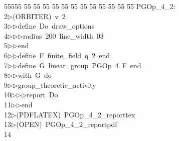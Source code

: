 %
%
\begin{tabbing}
55555 \= 55 \= 55 \= 55 \= 55 \= 55 \= 55 \= 55 \= 55 \= 55 \= 55 \= 55 \= 55 \= \>PGOp\_4\_2:\\[0pt]
2\>$\triangleright$\>(ORBITER)\ v\ 2\ \\[0pt]
3\>$\triangleright$\>$\triangleright$\>define\ Do\ draw\_options\ \\[0pt]
4\>$\triangleright$\>$\triangleright$\>$\triangleright$\>radius\ 200\ line\_width\ 03\ \\[0pt]
5\>$\triangleright$\>$\triangleright$\>end\ \\[0pt]
6\>$\triangleright$\>$\triangleright$\>define\ F\ finite\_field\ q\ 2\ end\ \\[0pt]
7\>$\triangleright$\>$\triangleright$\>define\ G\ linear\_group\ PGOp\ 4\ F\ end\ \\[0pt]
8\>$\triangleright$\>$\triangleright$\>with\ G\ do\ \\[0pt]
9\>$\triangleright$\>$\triangleright$\>group\_theoretic\_activity\ \\[0pt]
10\>$\triangleright$\>$\triangleright$\>$\triangleright$\>report\ Do\ \\[0pt]
11\>$\triangleright$\>$\triangleright$\>end\\[0pt]
12\>$\triangleright$\>(PDFLATEX)\ PGOp\_4\_2\_reporttex\\[0pt]
13\>$\triangleright$\>(OPEN)\ PGOp\_4\_2\_reportpdf\\[0pt]
14\>\end{tabbing}
